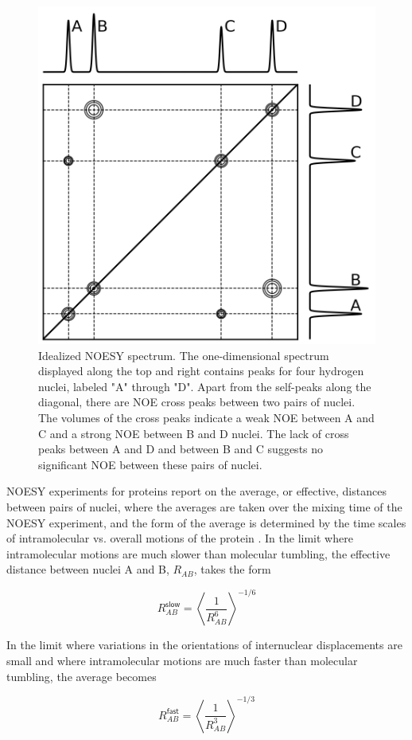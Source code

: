 \documentclass[9pt,review,pubversion]{livecoms}
\begin{document}
\begin{figure}[t]
    \centering
    \includegraphics[width=3 in]{noesy-2d.png}
    \caption{Idealized NOESY spectrum.
    The one-dimensional spectrum displayed along the top and right contains peaks for four hydrogen nuclei, labeled "A" through "D".
    Apart from the self-peaks along the diagonal, there are NOE cross peaks between two pairs of nuclei.
    The volumes of the cross peaks indicate a weak NOE between A and C and a strong NOE between B and D nuclei.
    The lack of cross peaks between A and D and between B and C suggests no significant NOE between these pairs of nuclei.}
    \label{fig:noesy-2d}
\end{figure}

NOESY experiments for proteins report on the average, or effective, distances between pairs of nuclei, where the averages are taken over the mixing time of the NOESY experiment, and the form of the average is determined by the time scales of intramolecular vs. overall motions of the protein \cite{neuhaus_nuclear_2000,vogeli_nuclear_2014}.
In the limit where intramolecular motions are much slower than molecular tumbling, the effective distance between nuclei A and B, $R_{AB}$, takes the form

\begin{equation}
\label{eqn:noe_R_slow}
R_{AB}^{\mathsf{slow}} = \left \langle \frac {1} {R_{AB}^6} \right \rangle^{-1/6}
\end{equation}

\noindent In the limit where variations in the orientations of internuclear displacements are small and where intramolecular motions are much faster than molecular tumbling, the average becomes 

\begin{equation}
\label{eqn:noe_R_fast}
R_{AB}^{\mathsf{fast}} = \left \langle \frac {1} {R_{AB}^3} \right \rangle^{-1/3}
\end{equation}
\end{document}

